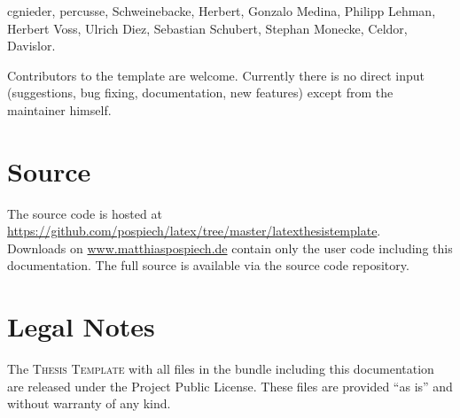 cgnieder, %
percusse, %
Schweinebacke, %
Herbert, %
Gonzalo Medina, %
Philipp Lehman, %
Herbert Voss,
Ulrich Diez,
Sebastian Schubert,
Stephan Monecke,
Celdor,
Davislor.

Contributors to the template are welcome. Currently there is no direct input (suggestions, bug fixing, documentation, new features) except from the maintainer himself.

\section*{Source}
The source code is hosted at \\
\url{https://github.com/pospiech/latex/tree/master/latexthesistemplate}. \\
Downloads on \url{www.matthiaspospiech.de} contain only the user code including this documentation. The full source is available via the source code repository.

\section*{Legal Notes}
The \textsc{\latex Thesis Template} with all files in the bundle including this documentation are released under the \latex Project Public License. These files are provided “as is” and without warranty of any kind.

